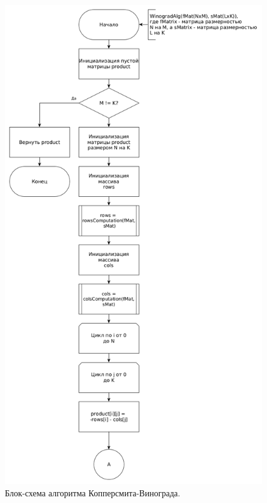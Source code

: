 \documentclass[12pt]{report}
\begin{document}
\begin{figure}
\begin{center}
\includegraphics[scale=0.33]{inc/img/Winograd.png}
\captionsetup{justification=centering}
	\caption{Блок-схема алгоритма Копперсмита-Винограда.}
	\label{img:Winograd1}	
\end{center}
\end{figure}
\end{document}
